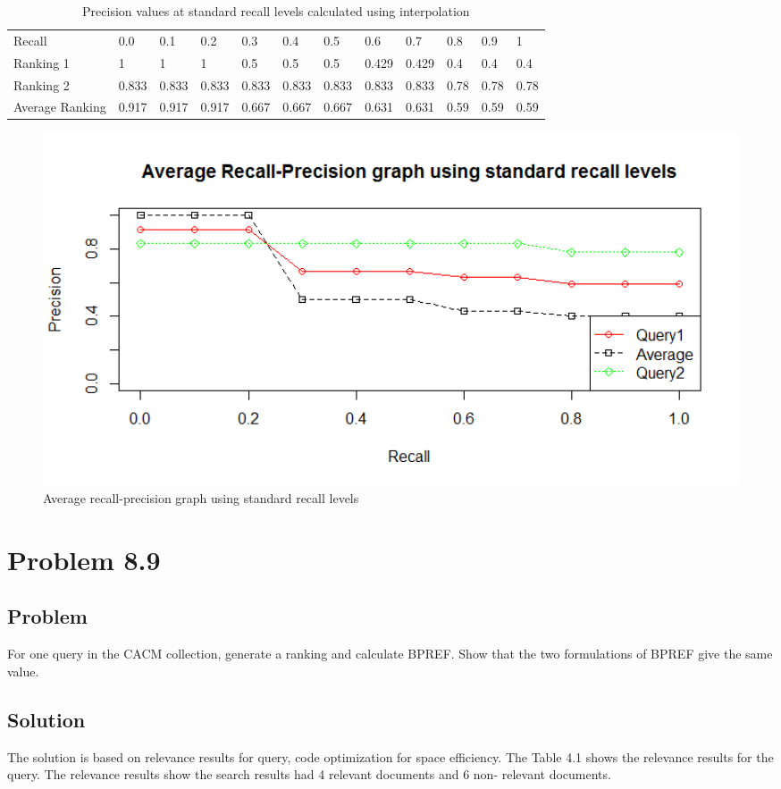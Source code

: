 \documentclass[12pt]{report}
\begin{document}
\begin{table}[]
\centering
\caption{Precision values at standard recall levels calculated using interpolation}
\label{my-label}
\begin{tabular}{llllllllllll}
Recall          & 0.0   & 0.1   & 0.2   & 0.3   & 0.4   & 0.5   & 0.6   & 0.7   & 0.8  & 0.9  & 1    \\
Ranking 1       & 1     & 1     & 1     & 0.5   & 0.5   & 0.5   & 0.429 & 0.429 & 0.4  & 0.4  & 0.4  \\
Ranking 2       & 0.833 & 0.833 & 0.833 & 0.833 & 0.833 & 0.833 & 0.833 & 0.833 & 0.78 & 0.78 & 0.78 \\
Average Ranking & 0.917 & 0.917 & 0.917 & 0.667 & 0.667 & 0.667 & 0.631 & 0.631 & 0.59 & 0.59 & 0.59
\end{tabular}
\end{table}

\begin{figure}[ht]
  \centering
  \includegraphics[width=1\textwidth]{Problem8_4/Averagerecallprecision.png}
  \caption{Average recall-precision graph using standard recall levels}
  \label{fig:1}
\end{figure}

\chapter{Problem 8.9}
\section{Problem}
For one query in the CACM collection, generate a ranking and calculate BPREF. Show that the two formulations of BPREF give the same value.
\section{Solution}
The solution is based on relevance results for query, code optimization for space efficiency. The Table 4.1 shows the relevance results for the query. The relevance results show the search results had 4 relevant documents and 6 non- relevant documents. 
\end{document}
